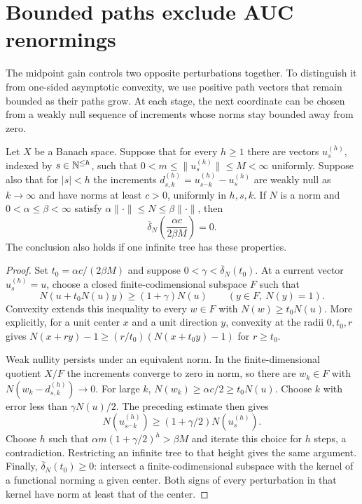 \section{Bounded paths exclude AUC renormings}\label{rec:obstruction}

The midpoint gain controls two opposite perturbations together.
To distinguish it from one-sided asymptotic convexity, we use positive
path vectors that remain bounded as their paths grow. At each stage,
the next coordinate can be chosen from a weakly null sequence of
increments whose norms stay bounded away from zero.

\begin{lemma}\label{rec:bounded-tree}
Let $X$ be a Banach space. Suppose that for every $h\ge1$ there are
vectors $u_s^{(h)}$, indexed by $s\in\mathbb N^{\le h}$, such that
$0<m\le\|u_s^{(h)}\|\le M<\infty$ uniformly. Suppose also that for
$|s|<h$ the increments
$d_{s,k}^{(h)}=u_{s^\frown k}^{(h)}-u_s^{(h)}$ are weakly null as
$k\to\infty$ and have norms at least $c>0$, uniformly in $h,s,k$.
If $N$ is a norm and $0<\alpha\le\beta<\infty$ satisfy
$\alpha\|\cdot\|\le N\le\beta\|\cdot\|$, then
\[
 \overline\delta_N\left(\frac{\alpha c}{2\beta M}\right)=0.
\]
The conclusion also holds if one infinite tree has these properties.
\end{lemma}

\begin{proof}
Set $t_0=\alpha c/(2\beta M)$ and suppose
$0<\gamma<\overline\delta_N(t_0)$. At a current vector $u_s^{(h)}=u$,
choose a closed finite-codimensional subspace $F$ such that
\[
 N(u+t_0N(u)y)\ge(1+\gamma)N(u)
 \qquad(y\in F,\ N(y)=1).
\]
Convexity extends this inequality to every $w\in F$ with
$N(w)\ge t_0N(u)$. More explicitly, for a unit center $x$ and a unit
direction $y$, convexity at the radii $0,t_0,r$ gives
$N(x+ry)-1\ge(r/t_0)(N(x+t_0y)-1)$ for $r\ge t_0$.

Weak nullity persists under an equivalent norm. In the finite-dimensional
quotient $X/F$ the increments converge to zero in norm, so there are
$w_k\in F$ with $N(w_k-d_{s,k}^{(h)})\to0$.
For large $k$,
$N(w_k)\ge\alpha c/2\ge t_0N(u)$.
Choose $k$ with error less than $\gamma N(u)/2$. The preceding estimate
then gives
\[
 N(u_{s^\frown k}^{(h)})\ge(1+\gamma/2)N(u_s^{(h)}).
\]
Choose $h$ such that $\alpha m(1+\gamma/2)^h>\beta M$ and iterate this
choice for $h$ steps, a contradiction. Restricting an infinite tree to
that height gives the same argument. Finally,
$\overline\delta_N(t_0)\ge0$: intersect a finite-codimensional subspace
with the kernel of a functional norming a given center. Both signs of
every perturbation in that kernel have norm at least that of the center.
\end{proof}

